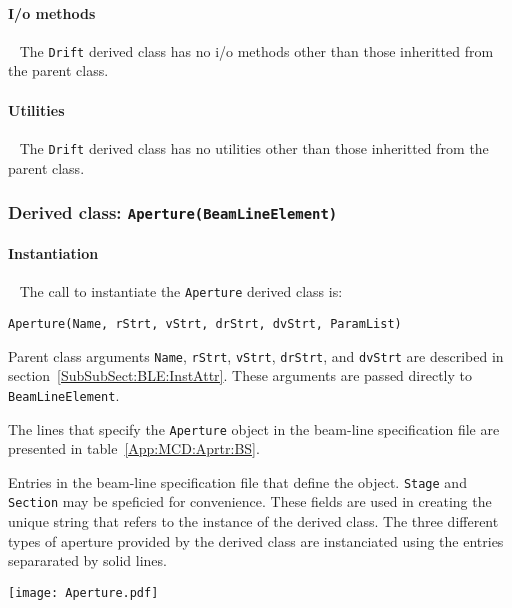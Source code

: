 \paragraph{I/o methods} ~\newline
\noindent
The \texttt{Drift} derived class has no i/o methods other than
those inheritted from the parent class.

\paragraph{Utilities} ~\newline
\noindent
The \texttt{Drift} derived class has no utilities other than those
inheritted from the parent class. 

\FloatBarrier

\subsubsection{Derived class: \texttt{Aperture(BeamLineElement)}}

\paragraph{Instantiation} ~\newline
\noindent
The call to instantiate the \texttt{Aperture} derived class is:
\begin{center}
  \texttt{Aperture(Name, rStrt, vStrt, drStrt, dvStrt, ParamList)}
\end{center}
Parent class arguments \texttt{Name}, \texttt{rStrt}, \texttt{vStrt},
\texttt{drStrt}, and \texttt{dvStrt} are described in
section~\ref{SubSubSect:BLE:InstAttr}.
These arguments are passed directly to \texttt{BeamLineElement}.

The lines that specify the \texttt{Aperture} object in the beam-line
specification file are presented in table~\ref{App:MCD:Aprtr:BS}.
\begin{table}[h]
  \caption{
    Entries in the beam-line specification file that define the
    object.
    \texttt{Stage} and \texttt{Section} may be speficied for
    convenience.
    These fields are used in creating the unique string that refers
    to the instance of the derived class.
    The three different types of aperture provided by the derived
    class are instanciated using the entries separarated by solid
    lines.
  }
  \label{App:MCD:Aprtr:BS}
  \begin{center}
    \texttt{[image: Aperture.pdf]}
  \end{center}
\end{table}

